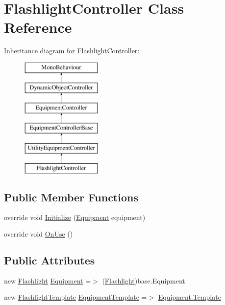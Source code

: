 \hypertarget{class_flashlight_controller}{}\section{Flashlight\+Controller Class Reference}
\label{class_flashlight_controller}
Inheritance diagram for Flashlight\+Controller\+:\begin{figure}[H]
\begin{center}
\leavevmode
\includegraphics[height=6.000000cm]{class_flashlight_controller}
\end{center}
\end{figure}
\subsection*{Public Member Functions}
\begin{DoxyCompactItemize}
\item 
override void \mbox{\hyperlink{class_flashlight_controller_a3bc506518b599e1f8af7dfacb2180b35}{Initialize}} (\mbox{\hyperlink{class_equipment}{Equipment}} equipment)
\item 
override void \mbox{\hyperlink{class_flashlight_controller_aec521de4f68b86b7c48a9757119ed099}{On\+Use}} ()
\end{DoxyCompactItemize}
\subsection*{Public Attributes}
\begin{DoxyCompactItemize}
\item 
new \mbox{\hyperlink{class_flashlight}{Flashlight}} \mbox{\hyperlink{class_flashlight_controller_a4fc07eb15877d1ae91b632cc77e77c36}{Equipment}} =$>$ (\mbox{\hyperlink{class_flashlight}{Flashlight}})base.\+Equipment
\item 
new \mbox{\hyperlink{class_flashlight_template}{Flashlight\+Template}} \mbox{\hyperlink{class_flashlight_controller_a1a431b24c71437bfab2fe659b9b4db2d}{Equipment\+Template}} =$>$ \mbox{\hyperlink{class_equipment_a691c8de53afa564d0b1a0f1adb0978b7}{Equipment.\+Template}}
\end{DoxyCompactItemize}
